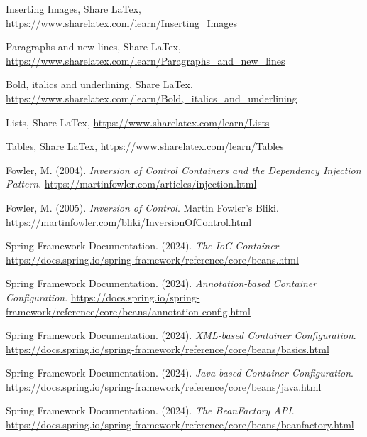 \documentclass[12pt,a4paper]{report}
\begin{document}
\singlespace
\clearpage
{}
\begin{thebibliography}{}

    Inserting Images, Share LaTex,
    \url{https://www.sharelatex.com/learn/Inserting_Images}

    Paragraphs and new lines, Share LaTex,
    \url{https://www.sharelatex.com/learn/Paragraphs_and_new_lines}

    Bold, italics and underlining, Share LaTex,
    \url{https://www.sharelatex.com/learn/Bold,_italics_and_underlining}

    Lists, Share LaTex,
    \url{https://www.sharelatex.com/learn/Lists}

    Tables, Share LaTex,
    \url{https://www.sharelatex.com/learn/Tables}

    Fowler, M. (2004).
    \textit{Inversion of Control Containers and
    the Dependency Injection Pattern}.
    \url{https://martinfowler.com/articles/injection.html}

    Fowler, M. (2005).
    \textit{Inversion of Control}. Martin Fowler's Bliki.
    \url{https://martinfowler.com/bliki/InversionOfControl.html}

    Spring Framework Documentation. (2024).
    \textit{The IoC Container}.
    \url{https://docs.spring.io/spring-framework/reference/core/beans.html}

    Spring Framework Documentation. (2024).
    \textit{Annotation-based Container Configuration}.
    \url{https://docs.spring.io/spring-framework/reference/core/beans/annotation-config.html}

    Spring Framework Documentation. (2024).
    \textit{XML-based Container Configuration}.
    \url{https://docs.spring.io/spring-framework/reference/core/beans/basics.html}

    Spring Framework Documentation. (2024).
    \textit{Java-based Container Configuration}.
    \url{https://docs.spring.io/spring-framework/reference/core/beans/java.html}

    Spring Framework Documentation. (2024).
    \textit{The BeanFactory API}.
    \url{https://docs.spring.io/spring-framework/reference/core/beans/beanfactory.html}


\end{thebibliography}
\end{document}
